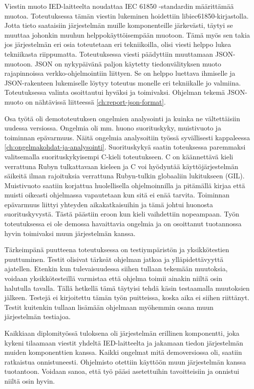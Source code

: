 Viestin muoto IED-laitteelta noudattaa IEC 61850 -standardin määrittämää muotoa. Toteutuksessa tämän viestin lukeminen hoidettiin libiec61850-kirjastolla. Jotta tieto saataisiin järjestelmän muille komponenteille järkevästi, täytyi se muuttaa johonkin muuhun helppokäyttöisempään muotoon. Tämä myös sen takia jos järjestelmän eri osia toteutetaan eri tekniikoilla, olisi viesti helppo lukea tekniikasta riippumatta. Toteutuksessa viesti päädyttiin muuttamaan JSON-muotoon. JSON on nykypäivänä paljon käytetty tiedonvälityksen muoto rajapinnoissa verkko-ohjelmointiin liittyen. Se on helppo luettava ihmiselle ja JSON-rakenteen lukemiselle löytyy toteutus monelle eri tekniikalle jo valmiina. Toteutuksessa valinta osoittautui hyväksi ja toimivaksi. Ohjelman tekemä JSON-muoto on nähtävissä liitteessä \ref{ch:report-json-format}.

Osa työtä oli demototeutuksen ongelmien analysointi ja kuinka ne vältettäisiin uudessa versiossa. Ongelmia oli mm. huono suorituskyky, muistivuoto ja toiminnan epävarmuus. Näitä ongelmia analysoitiin työssä syvällisesti kappaleessa \ref{ch:ongelmakohdat-ja-analysointi}. Suorituskykyä saatin toteuksessa paremmaksi valitsemalla suorituskykyisempi C-kieli toteutukseen. C on käännettävä kieli verrattuna Rubyn tulkattavaan kieleen ja C voi hyödyntää käyttöjärjestelmän säikeitä ilman rajoituksia verrattuna Rubyn-tulkin globaaliin lukitukseen (GIL). Muistivuoto saatiin korjattua huolellisella ohjelmoinnilla ja pitämällä kirjaa että muisti oikeasti ohjelmassa vapautetaan kun sitä ei enää tarvita. Toiminnan epävarmuus liittyi yhteyden aikakatkaisuihin ja tämä johtui huonosta suorituskyvystä. Tästä päästiin eroon kun kieli vaihdettiin nopeampaan. Työn toteutuksessa ei ole demossa havaittavia ongelmia ja on osoittanut tuotannossa hyvin toimivaksi muun järjestelmän kanssa.

Tärkeimpänä puutteena toteutuksessa on testiympäristön ja yksikkötestien puuttuminen. Testit olisivat tärkeät ohjelman jatkoa ja ylläpidettävyyttä ajatellen. Etenkin kun tulevaisuudessa siihen tullaan tekemään muutoksia, voidaan yksikkötesteillä varmistaa että ohjelma toimii ainakin niiltä osin halutulla tavalla. Tällä hetkellä tämä täytyisi tehdä käsin testaamalla muutoksien jälkeen. Testejä ei kirjoitettu tämän työn puitteissa, koska aika ei siihen riittänyt. Testit kuitenkin tullaan lisämään ohjelmaan myöhemmin osana muun järjestelmän testiajoa.

Kaikkiaan diplomityössä tuloksena oli järjestelmän erillinen komponentti, joka kykeni tilaamaan viestit yhdeltä IED-laitteelta ja jakamaan tiedon järjestelmän muiden komponenttien kanssa. Kaikki ongelmat mitä demoversiossa oli, saatiin ratkaistua onnistuneesti. Ohjelmisto otettiin käyttöön muun järjestelmän kanssa tuotantoon. Voidaan sanoa, että työ pääsi asetettuihin tavoitteisiin ja onnistui niiltä osin hyvin.